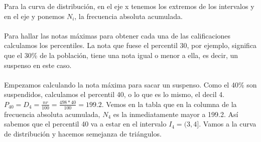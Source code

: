 \documentclass{article}
\begin{document}
    \begin{center}
    \end{center} 
    Para la curva de distribución, en el eje x tenemos los extremos de los intervalos y en el eje y ponemos $N_i$, la frecuencia absoluta acumulada. \\ \\
    Para hallar las notas máximas para obtener cada una de las calificaciones calculamos los percentiles. La nota que fuese el percentil 30, por ejemplo, significa que el 30\% de la población, tiene una nota igual o menor a ella, es decir, un suspenso en este caso. \\ \\ 
    Empezamos calculando la nota máxima para sacar un suspenso. Como el 40\% son suspendidos, calculamos el percentil 40, o lo que es lo mismo, el decil 4. $P_{40} = D_{4} = \frac{nr}{100} = \frac{498*40}{100} = 199.2$. Vemos en la tabla que en la columna de la frecuencia absoluta acumulada, $N_4$ es la inmediatamente mayor a 199.2. Así sabemos que el percentil 40 va a estar en el intervalo $I_4 = (3,4]$. Vamos a la curva de distribución y hacemos semejanza de triángulos. \\
    
\end{document}
